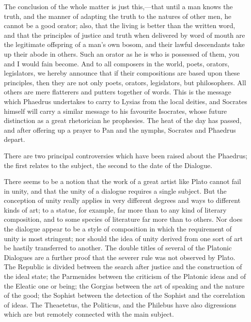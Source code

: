 \documentclass[11pt,letter]{article}
\begin{document}
\par  The conclusion of the whole matter is just this,—that until a man knows the truth, and the manner of adapting the truth to the natures of other men, he cannot be a good orator; also, that the living is better than the written word, and that the principles of justice and truth when delivered by word of mouth are the legitimate offspring of a man's own bosom, and their lawful descendants take up their abode in others. Such an orator as he is who is possessed of them, you and I would fain become. And to all composers in the world, poets, orators, legislators, we hereby announce that if their compositions are based upon these principles, then they are not only poets, orators, legislators, but philosophers. All others are mere flatterers and putters together of words. This is the message which Phaedrus undertakes to carry to Lysias from the local deities, and Socrates himself will carry a similar message to his favourite Isocrates, whose future distinction as a great rhetorician he prophesies. The heat of the day has passed, and after offering up a prayer to Pan and the nymphs, Socrates and Phaedrus depart.

\par  There are two principal controversies which have been raised about the Phaedrus; the first relates to the subject, the second to the date of the Dialogue.

\par  There seems to be a notion that the work of a great artist like Plato cannot fail in unity, and that the unity of a dialogue requires a single subject. But the conception of unity really applies in very different degrees and ways to different kinds of art; to a statue, for example, far more than to any kind of literary composition, and to some species of literature far more than to others. Nor does the dialogue appear to be a style of composition in which the requirement of unity is most stringent; nor should the idea of unity derived from one sort of art be hastily transferred to another. The double titles of several of the Platonic Dialogues are a further proof that the severer rule was not observed by Plato. The Republic is divided between the search after justice and the construction of the ideal state; the Parmenides between the criticism of the Platonic ideas and of the Eleatic one or being; the Gorgias between the art of speaking and the nature of the good; the Sophist between the detection of the Sophist and the correlation of ideas. The Theaetetus, the Politicus, and the Philebus have also digressions which are but remotely connected with the main subject.
\end{document}
